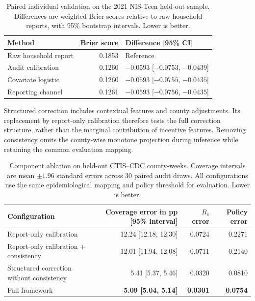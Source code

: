 \documentclass[sigconf,review]{acmart}
\begin{document}
\begin{table}[h]
\centering
\caption{Paired individual validation on the 2021 NIS-Teen
held-out sample. Differences are weighted Brier scores
relative to raw household reports, with 95\% bootstrap
intervals. Lower is better.}
\label{tab:nis-teen-validation}
\small
\setlength{\tabcolsep}{3pt}
\renewcommand{\arraystretch}{1.02}
\begin{tabularx}{\columnwidth}{
@{}
>{\raggedright\arraybackslash}X
r
>{\centering\arraybackslash}p{}
@{}}
\toprule
Method & Brier score & Difference [95\% CI] \\
\midrule
Raw household report
& 0.1853 & Reference \\
Audit calibration
& 0.1260 & $-0.0593$ [$-0.0753$, $-0.0439$] \\
Covariate logistic
& 0.1260 & $-0.0593$ [$-0.0755$, $-0.0435$] \\
Reporting channel
& 0.1261 & $-0.0593$ [$-0.0756$, $-0.0435$] \\
\bottomrule
\end{tabularx}
\end{table}


Structured correction includes contextual features and county adjustments. Its replacement by report-only calibration therefore tests the full correction structure, rather than the marginal contribution of incentive features. Removing consistency omits the county-wise monotone projection during inference while retaining the common evaluation mapping.

\begin{table}[h]
\centering
\caption{Component ablation on held-out CTIS--CDC county-weeks.
Coverage intervals are mean $\pm1.96$ standard errors across
30 paired audit draws. All configurations use the same
epidemiological mapping and policy threshold for evaluation.
Lower is better.}
\label{tab:full-component-ablation}
\small
\setlength{\tabcolsep}{6pt}
\begin{tabular}{@{}lrrr@{}}
\toprule
Configuration
& Coverage error in pp [95\% interval]
& $R_c$ error
& Policy error \\
\midrule
Report-only calibration
& 12.24 [12.18, 12.30] & 0.0724 & 0.2271 \\
Report-only calibration + consistency
& 12.01 [11.94, 12.08] & 0.0711 & 0.2140 \\
Structured correction without consistency
& 5.41 [5.37, 5.46] & 0.0320 & 0.0810 \\
Full framework
& \textbf{5.09 [5.04, 5.14]}
& \textbf{0.0301}
& \textbf{0.0754} \\
\bottomrule
\end{tabular}
\end{table}
\end{document}

